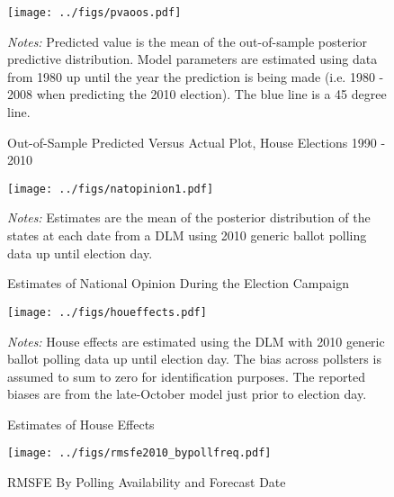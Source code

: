 \documentclass[12pt,final,fleqn]{article}
\theoremstyle{plain}
\begin{document}
\begin{figure}[!htb]
\texttt{[image: ../figs/pvaoos.pdf]}
\vspace{.5cm}
\caption{Out-of-Sample Predicted Versus Actual Plot, House Elections 1990 - 2010}
\label{fig:Out-of-Sample Predicted Versus Actual Plot, House Elections 1990 - 2010}
\begin{minipage}{\linewidth}
\footnotesize
\emph{Notes:} Predicted value is the mean of the out-of-sample posterior predictive distribution. Model parameters are estimated using data from 1980 up until the year the prediction is being made (i.e. 1980 - 2008 when predicting the 2010 election). The blue line is a 45 degree line. 
\end{minipage}
\end{figure}

\begin{figure}[!htb]
\centering
\texttt{[image: ../figs/natopinion1.pdf]}
\vspace{.5cm}
\caption{Estimates of National Opinion During the Election Campaign}
\label{fig:Estimates of National Opinion During the Election Campaign}
\begin{minipage}{\linewidth}
\footnotesize
\emph{Notes:} Estimates are the mean of the posterior distribution of the states at each date from a DLM using 2010 generic ballot polling data up until election day.
\end{minipage}
\end{figure}

\begin{figure}[!htb]
\begin{center}
\texttt{[image: ../figs/houeffects.pdf]}
\vspace{.5cm}
\caption{Estimates of House Effects}
\label{fig:Estimates of House Effects}
\begin{minipage}{\linewidth}
\footnotesize
\emph{Notes:} House effects are estimated using the DLM with 2010 generic ballot polling data up until election day. The bias across pollsters is assumed to sum to zero for identification purposes. The reported biases are from the late-October model just prior to election day.
\end{minipage}
\end{center}
\end{figure}

\begin{figure}[!htb]
\begin{center}
\texttt{[image: ../figs/rmsfe2010\_bypollfreq.pdf]}
\vspace{.5cm}
\caption{RMSFE By Polling Availability and Forecast Date}
\label{fig:RMSFE By Polling Availability and Forecast Date}
\begin{minipage}{\linewidth}
\footnotesize
\end{minipage}
\end{center}
\end{figure}
\end{document}

